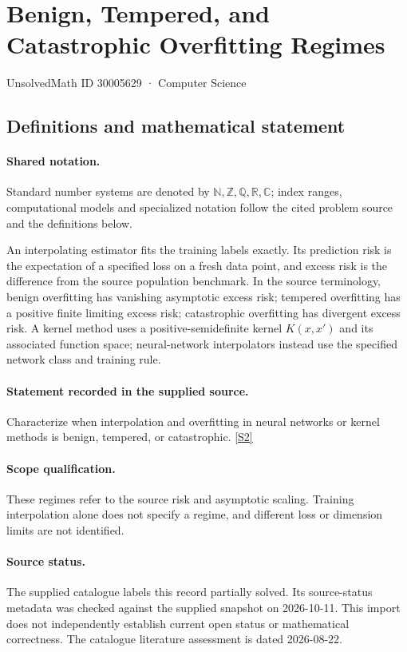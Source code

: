 \documentclass[11pt]{article}
\newcommand{\sref}[2]{\hyperlink{source:#1:#2}{[S#2]}}
\begin{document}
\setcounter{section}{30005628}
\section{Benign, Tempered, and Catastrophic Overfitting Regimes}\label{30005629}
{\small\sffamily UnsolvedMath ID 30005629 · Computer Science}
\subsection{Definitions and mathematical statement}

\paragraph{Shared notation.}Standard number systems are denoted by $\mathbb N,\mathbb Z,\mathbb Q,\mathbb R,\mathbb C$; index ranges, computational models and specialized notation follow the cited problem source and the definitions below.


An interpolating estimator fits the training labels exactly. Its prediction risk is the expectation of a specified loss on a fresh data point, and excess risk is the difference from the source population benchmark. In the source terminology, benign overfitting has vanishing asymptotic excess risk; tempered overfitting has a positive finite limiting excess risk; catastrophic overfitting has divergent excess risk. A kernel method uses a positive-semidefinite kernel $K(x,x')$ and its associated function space; neural-network interpolators instead use the specified network class and training rule.
\paragraph{Statement recorded in the supplied source.}
Characterize when interpolation and overfitting in neural networks or kernel methods is benign, tempered, or catastrophic. \sref{30005629}{2}
\paragraph{Scope qualification.}
These regimes refer to the source risk and asymptotic scaling. Training interpolation alone does not specify a regime, and different loss or dimension limits are not identified.
\paragraph{Source status.}
The supplied catalogue labels this record partially solved. Its source-status metadata was checked against the supplied snapshot on 2026-10-11. This import does not independently establish current open status or mathematical correctness. The catalogue literature assessment is dated 2026-08-22.
\end{document}
